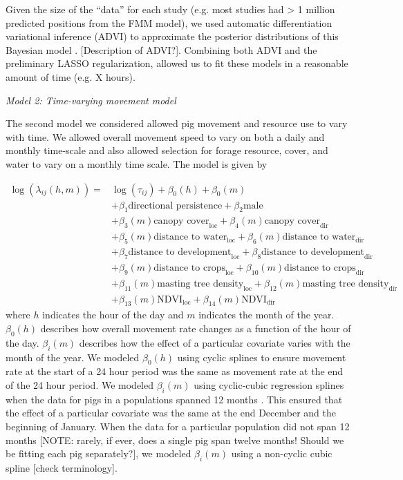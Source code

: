 \documentclass[a4paper]{article}
\begin{document}
Given the size of the ``data'' for each study (e.g. most studies had > 1 million predicted positions from the FMM model), we used automatic differentiation variational inference (ADVI) to approximate the posterior distributions of this Bayesian model \citep{Kucukelbir2015}. [Description of ADVI?]. Combining both ADVI and the preliminary LASSO regularization, allowed us to fit these models in a reasonable amount of time (e.g. X hours).

\bigskip
\noindent
\emph{Model 2: Time-varying movement model}

The second model we considered allowed pig movement and resource use to vary with time. We allowed overall movement speed to vary on both a daily and monthly time-scale and also allowed selection for forage resource, cover, and water to vary on a monthly time scale.  The model is given by

\begin{align}
  \log(\lambda_{ij}(h, m)) = & \log(\tau_{ij}) + \beta_0(h) + \beta_0(m) \\
  & + \beta_1 \text{directional persistence} + \beta_2 \text{male  } \\
  & + \beta_{3}(m) \text{canopy cover}_{\text{loc}} + \beta_{4}(m) \text{canopy cover}_{\text{dir}} \\
  & + \beta_5(m) \text{distance to water}_{\text{loc}} + \beta_6(m) \text{distance to water}_{\text{dir}} \\
  & + \beta_7 \text{distance to development}_{\text{loc}} + \beta_8 \text{distance to development}_{\text{dir}} \\
  & + \beta_9(m) \text{distance to crops}_{\text{loc}} + \beta_{10}(m) \text{distance to crops}_{\text{dir}} \\
  & + \beta_{11}(m) \text{masting tree density}_{\text{loc}} + \beta_{12}(m) \text{masting tree density}_{\text{dir}} \\
  & + \beta_{13}(m) \text{NDVI}_{\text{loc}} + \beta_{14}(m) \text{NDVI}_{\text{dir}}
\end{align}
where $h$ indicates the hour of the day and $m$ indicates the month of the year.  $\beta_0(h)$ describes how overall movement rate changes as a function of the hour of the day. $\beta_i(m)$ describes how the effect of a particular covariate varies with the month of the year. We modeled $\beta_0(h)$ using cyclic splines to ensure movement rate at the start of a 24 hour period was the same as movement rate at the end of the 24 hour period. We modeled $\beta_i(m)$ using cyclic-cubic regression splines when the data for pigs in a populations spanned 12 months \citep{Wood2006}. This ensured that the effect of a particular covariate was the same at the end December and the beginning of January.  When the data for a particular population did not span 12 months [NOTE: rarely, if ever, does a single pig span twelve months! Should we be fitting each pig separately?], we modeled $\beta_i(m)$ using a non-cyclic cubic spline [check terminology].
\end{document}
